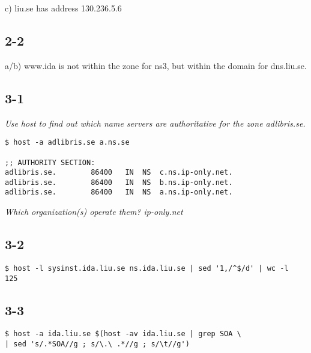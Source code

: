 c) liu.se has address 130.236.5.6

\subsection{2-2}

a/b) www.ida is not within the zone for ns3, but within the domain for dns.liu.se.

\subsection{3-1}

\em Use host to find out which name servers are authoritative for the zone adlibris.se. \em
\begin{verbatim}
$ host -a adlibris.se a.ns.se

;; AUTHORITY SECTION:
adlibris.se.		86400	IN	NS	c.ns.ip-only.net.
adlibris.se.		86400	IN	NS	b.ns.ip-only.net.
adlibris.se.		86400	IN	NS	a.ns.ip-only.net.
\end{verbatim}

\em Which organization(s) operate them?\em
ip-only.net

\subsection{3-2}

\verb=$ host -l sysinst.ida.liu.se ns.ida.liu.se | sed '1,/^$/d' | wc -l=\\
\verb=125=

\subsection{3-3}

\verb=$ host -a ida.liu.se $(host -av ida.liu.se | grep SOA \=\\
\verb=| sed 's/.*SOA//g ; s/\.\ .*//g ; s/\t//g')=

